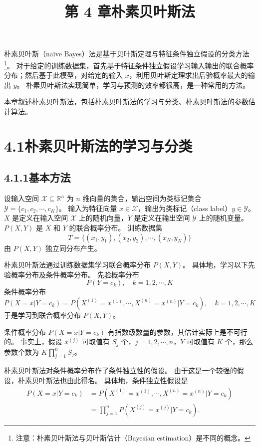 \documentclass[UTF8, 12pt, fontset=fandol, oneside]{ctexart}
\title{第 4 章\quad 朴素贝叶斯法}
\author{}
\date{}
\begin{document}
\maketitle

朴素贝叶斯（naïve Bayes）法是基于贝叶斯定理与特征条件独立假设的分类方法\footnote{注意：朴素贝叶斯法与贝叶斯估计（Bayesian estimation）是不同的概念。}。
对于给定的训练数据集，首先基于特征条件独立假设学习输入输出的联合概率分布；然后基于此模型，对给定的输入 $x$，利用贝叶斯定理求出后验概率最大的输出 $y$。
朴素贝叶斯法实现简单，学习与预测的效率都很高，是一种常用的方法。

本章叙述朴素贝叶斯法，包括朴素贝叶斯法的学习与分类、朴素贝叶斯法的参数估计算法。

\section*{4.1\quad 朴素贝叶斯法的学习与分类}

\subsection*{4.1.1\quad 基本方法}

设输入空间 $\mathcal{X}\subseteq \mathbb{R}^n$ 为 $n$ 维向量的集合，输出空间为类标记集合 $\mathcal{Y}=\{c_1,c_2,\cdots,c_K\}$。
输入为特征向量 $x\in\mathcal{X}$，输出为类标记（class label）$y\in\mathcal{Y}$。
$X$ 是定义在输入空间 $\mathcal{X}$ 上的随机向量，$Y$ 是定义在输出空间 $\mathcal{Y}$ 上的随机变量。
$P(X,Y)$ 是 $X$ 和 $Y$ 的联合概率分布。
训练数据集
\[
  T=\{(x_1,y_1),(x_2,y_2),\cdots,(x_N,y_N)\}
\]
由 $P(X,Y)$ 独立同分布产生。

朴素贝叶斯法通过训练数据集学习联合概率分布 $P(X,Y)$。
具体地，学习以下先验概率分布及条件概率分布。
先验概率分布
\begin{equation}
  P(Y=c_k),\quad k=1,2,\cdots,K
  \tag{4.1}
\end{equation}
条件概率分布
\begin{equation}
  P(X=x|Y=c_k)=P(X^{(1)}=x^{(1)},\cdots,X^{(n)}=x^{(n)}|Y=c_k),
  \quad k=1,2,\cdots,K
  \tag{4.2}
\end{equation}
于是学习到联合概率分布 $P(X,Y)$。

条件概率分布 $P(X=x|Y=c_k)$ 有指数级数量的参数，其估计实际上是不可行的。
事实上，假设 $x^{(j)}$ 可取值有 $S_j$ 个，$j=1,2,\cdots,n$，$Y$ 可取值有 $K$ 个，那么参数个数为 $K\prod_{j=1}^n S_j$。

朴素贝叶斯法对条件概率分布作了条件独立性的假设。
由于这是一个较强的假设，朴素贝叶斯法也由此得名。
具体地，条件独立性假设是
\begin{equation}
\begin{aligned}
  P(X=x|Y=c_k)
  &=P(X^{(1)}=x^{(1)},\cdots,X^{(n)}=x^{(n)}|Y=c_k) \\
  &=\prod_{j=1}^n P(X^{(j)}=x^{(j)}|Y=c_k).
\end{aligned}
\tag{4.3}
\end{equation}
\end{document}
